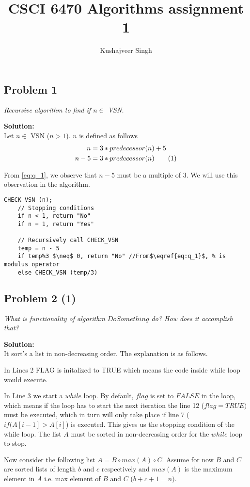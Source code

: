 \documentclass[12pt,a4paper]{article}
\title{CSCI 6470 Algorithms assignment 1}
\author{Kushajveer Singh}
\date{}
\newcommand\numberthis{\addtocounter{equation}{1}\tag{\theequation}}
\newcommand{\solution}{\noindent\textbf{Solution:}\\}
\begin{document}
\maketitle

\subsection*{Problem 1}
\textit{
    Recursive algorithm to find if $n \in$ VSN.
}

\solution
Let $n \in$ VSN ($n > 1$). $n$ is defined as follows 
\begin{align*}
    n &= 3*predecessor(n) + 5 \\
    n - 5 &= 3*predecessor(n) \numberthis \label{eq:q_1}
\end{align*}

From \eqref{eq:q_1}, we observe that $n - 5$ must be a multiple of 3. We will use this observation in the algorithm.

\begin{lstlisting}[title=Recursive algorithm to determine if $n \in VSN$, mathescape=true]
CHECK_VSN (n);
    // Stopping conditions
    if n < 1, return "No"
    if n = 1, return "Yes"
    
    // Recursively call CHECK_VSN
    temp = n - 5
    if temp%3 $\neq$ 0, return "No" //From$\eqref{eq:q_1}$, % is modulus operator
    else CHECK_VSN (temp/3)
\end{lstlisting}

\newpage
\subsection*{Problem 2 (1)}
\textit{
    What is functionality of algorithm $DoSomething$ do? How does it accomplish that?
}

\solution
It sort's a list in non-decreasing order. The explanation is as follows.

In Lines 2 FLAG is initalized to TRUE which means the code inside while loop would execute.

In Line 3 we start a $while$ loop. By default, $flag$ is set to $FALSE$ in the loop, which means if the loop has to start the next iteration the line 12 ($flag = TRUE)$ must be executed, which in turn will only take place if line 7 ($if (A[i-1] > A[i]$) is executed. This gives us the stopping condition of the while loop. The list $A$ must be sorted in non-decreasing order for the $while$ loop to stop.

Now consider the following list $A = B\circ max(A) \circ C$. Assume for now $B$ and $C$ are sorted lists of length $b$ and $c$ respectively and $max(A)$ is the maximum element in $A$ i.e. max element of $B$ and $C$ ($b + c + 1 = n)$.
\end{document}
